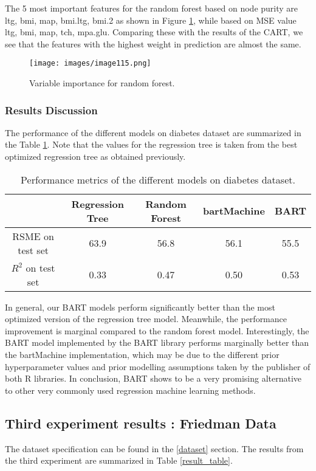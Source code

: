 \documentclass{usiinftr}
\begin{document}
The 5 most important features for the random forest based on node purity are ltg, bmi, map, bmi.ltg, bmi.2 as shown in Figure \ref{RFImp}, while based on MSE value ltg, bmi, map, tch, mpa.glu. Comparing these with the results of the CART, we see that the features with the highest weight in prediction are almost the same. 

\begin{figure}[h!] 
\centering
\texttt{[image: images/image115.png]}
\caption{Variable importance for random forest.}
\label{RFImp}
\end{figure}

\subsubsection{Results Discussion}
The performance of the different models on diabetes dataset are summarized in the Table \ref{result_diabetes}. Note that the values for the regression tree is taken from the best optimized regression tree as obtained previously. 

\begin{table} 
\centering \caption{Performance metrics of the different models on diabetes dataset.}
\begin{tabular}{|c|c|c|c|c|} 
\hline &  Regression Tree & Random Forest & bartMachine & BART \\
\hline RSME on test set & 63.9 & 56.8 & 56.1  & 55.5 \\
\hline $R^2$ on test set & 0.33 & 0.47 & 0.50  & 0.53\\
\hline
\end{tabular}
\label{result_diabetes}
\end{table}

In general, our BART models perform significantly better than the most optimized version of the regression tree model. Meanwhile, the performance improvement is marginal compared to the random forest model. Interestingly, the BART model implemented by the BART library performs marginally better than the bartMachine implementation, which may be due to the different prior hyperparameter values and prior modelling assumptions taken by the publisher of both R libraries. In conclusion, BART shows to be a very promising alternative to other very commonly used regression machine learning methods.

\subsection{Third experiment results : Friedman Data}
The dataset specification can be found in the \ref{dataset} section. The results from the third experiment are summarized in Table \ref{result_table}.
\end{document}
